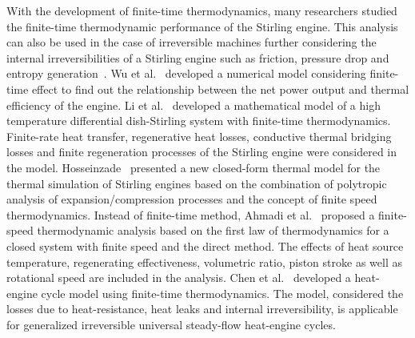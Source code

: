 \documentclass[review,3p,10t]{elsarticle}
\begin{document}
With the development of finite-time thermodynamics, many researchers studied the finite-time thermodynamic performance of the Stirling engine. This analysis can also be used in the case of irreversible machines further considering the internal irreversibilities of a Stirling engine such as friction, pressure drop and entropy generation~\cite{Barreto2017}.
Wu et al.~\cite{Wu1998} developed a numerical model considering finite-time effect to find out the relationship between the net power output and thermal efficiency of the engine. 
Li et al.~\cite{Li2011} developed a mathematical model of a high temperature differential dish-Stirling system with finite-time thermodynamics. Finite-rate heat transfer, regenerative heat losses, conductive thermal bridging losses and finite regeneration processes of the Stirling engine were considered in the model.
Hosseinzade~\cite{Hosseinzade2015} presented a new closed-form thermal model for the thermal simulation of Stirling engines based on the combination of polytropic analysis of expansion/compression processes and the concept of finite speed thermodynamics.
Instead of finite-time method, Ahmadi et al.~\cite{Ahmadi2016b} proposed a finite-speed thermodynamic analysis based on the first law of thermodynamics for a closed system with finite speed and the direct method. The effects of heat source temperature, regenerating effectiveness, volumetric ratio, piston stroke as well as rotational speed are included in the analysis.
Chen et al.~\cite{Chen2007} developed a heat-engine cycle model using finite-time thermodynamics. The model, considered the losses due to heat-resistance, heat leaks and internal irreversibility, is applicable for generalized irreversible universal steady-flow heat-engine cycles.
\end{document}

